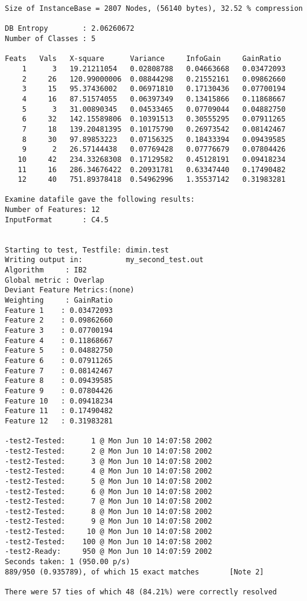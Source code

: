 \documentclass{article}
\begin{document}
\begin{verbatim}
Size of InstanceBase = 2807 Nodes, (56140 bytes), 32.52 % compression

DB Entropy        : 2.06260672
Number of Classes : 5

Feats   Vals   X-square      Variance     InfoGain     GainRatio
    1      3   19.21211054   0.02808788   0.04663668   0.03472093
    2     26   120.99000006  0.08844298   0.21552161   0.09862660
    3     15   95.37436002   0.06971810   0.17130436   0.07700194
    4     16   87.51574055   0.06397349   0.13415866   0.11868667
    5      3   31.00890345   0.04533465   0.07709044   0.04882750
    6     32   142.15589806  0.10391513   0.30555295   0.07911265
    7     18   139.20481395  0.10175790   0.26973542   0.08142467
    8     30   97.89853223   0.07156325   0.18433394   0.09439585
    9      2   26.57144438   0.07769428   0.07776679   0.07804426
   10     42   234.33268308  0.17129582   0.45128191   0.09418234
   11     16   286.34676422  0.20931781   0.63347440   0.17490482
   12     40   751.89378418  0.54962996   1.35537142   0.31983281

Examine datafile gave the following results:
Number of Features: 12
InputFormat       : C4.5


Starting to test, Testfile: dimin.test
Writing output in:          my_second_test.out
Algorithm     : IB2
Global metric : Overlap
Deviant Feature Metrics:(none)
Weighting     : GainRatio
Feature 1	 : 0.03472093
Feature 2	 : 0.09862660
Feature 3	 : 0.07700194
Feature 4	 : 0.11868667
Feature 5	 : 0.04882750
Feature 6	 : 0.07911265
Feature 7	 : 0.08142467
Feature 8	 : 0.09439585
Feature 9	 : 0.07804426
Feature 10	 : 0.09418234
Feature 11	 : 0.17490482
Feature 12	 : 0.31983281

-test2-Tested:      1 @ Mon Jun 10 14:07:58 2002
-test2-Tested:      2 @ Mon Jun 10 14:07:58 2002
-test2-Tested:      3 @ Mon Jun 10 14:07:58 2002
-test2-Tested:      4 @ Mon Jun 10 14:07:58 2002
-test2-Tested:      5 @ Mon Jun 10 14:07:58 2002
-test2-Tested:      6 @ Mon Jun 10 14:07:58 2002
-test2-Tested:      7 @ Mon Jun 10 14:07:58 2002
-test2-Tested:      8 @ Mon Jun 10 14:07:58 2002
-test2-Tested:      9 @ Mon Jun 10 14:07:58 2002
-test2-Tested:     10 @ Mon Jun 10 14:07:58 2002
-test2-Tested:    100 @ Mon Jun 10 14:07:58 2002
-test2-Ready:     950 @ Mon Jun 10 14:07:59 2002
Seconds taken: 1 (950.00 p/s)
889/950 (0.935789), of which 15 exact matches       [Note 2]

There were 57 ties of which 48 (84.21%) were correctly resolved
\end{verbatim}
\end{document}
